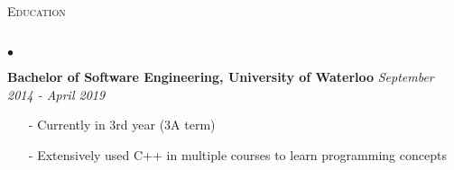 \documentclass[11pt]{article}
\newcommand{\lineunder}{\vspace*{-8pt} \\ \hspace*{-18pt} \hrulefill \\}
\newcommand{\header}[1]{{\hspace*{-15pt}\vspace*{6pt} \textsc{#1}} \vspace*{-6pt} \lineunder }
\newenvironment{achievements}{\begin{list}{$\bullet$}{\topsep 0pt \itemsep -1.5pt \leftmargin 5pt}}{\vspace*{4pt}\end{list}}
\begin{document}
\vspace{7pt}

\header{\fontsize{11.4}{10}\selectfont  Education}
\begin{achievements}
\item \textbf{Bachelor of Software Engineering, University of Waterloo} \hfill \textit {September 2014 - April 2019}
\begin{itemize}
\item[-] Currently in 3rd year (3A term)
\vspace{3pt}
\item[-] Extensively used C++ in multiple courses to learn programming concepts
\end{itemize}
\end{achievements}
\end{document}
